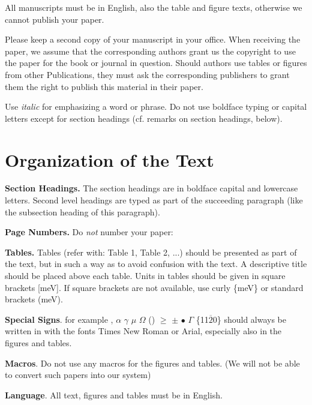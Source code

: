 \documentclass{TTP_DSL2006}
\begin{document}
All manuscripts must be in English, also the table and figure texts, otherwise we cannot publish your paper.

Please keep a second copy of your manuscript in your office. When receiving the paper, we assume 
that the corresponding authors grant us the copyright to use the paper for the book or journal in question.
Should authors use tables or figures from other Publications, they must ask the corresponding publishers to 
grant them the right to publish this material in their paper.

Use \textit{italic} for emphasizing a word or phrase. 
Do not use boldface typing or capital letters except for section headings (cf. remarks on section headings, below). 

\section{Organization of the Text}

\noindent \textbf{Section Headings.} The section headings are in boldface capital and lowercase letters. 
Second level headings are typed as part of the succeeding paragraph (like the subsection heading of this paragraph).

\textbf{Page Numbers.} Do \textit{not} number your paper: 

\textbf{Tables.} Tables (refer with: Table 1, Table 2, ...) should be presented as part of the text, but in such a 
way as to avoid confusion with the text. A descriptive title should be placed above each table. Units in tables should
 be given in square brackets [meV]. If square brackets are not available, use curly \{meV\} or standard brackets (meV). 

\textbf{Special Signs}. for example , $\alpha$ $\gamma$  $\mu$ $\Omega$ () $\ge$  $\pm$ $\bullet$  $\Gamma$ \{11$\overline{2}$0\} should always be written in with the 
fonts Times New Roman or Arial, especially also in the figures and tables.

\textbf{Macros}. Do not use any macros for the figures and tables. (We will not be able to convert such papers into our system)
\newpage

\textbf{Language}. All text, figures and tables must be in English.
\end{document}
